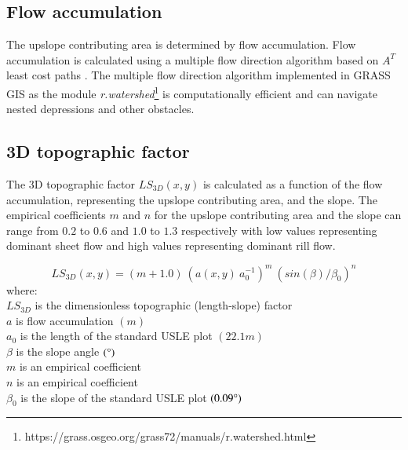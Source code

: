 \documentclass[final,3p,times,twocolumn]{elsarticle}
\begin{document}
\subsection{Flow accumulation}
The upslope contributing area is determined by flow accumulation. 
Flow accumulation is calculated using a multiple flow direction algorithm \cite{Metz2009} 
based on $A^{T}$ least cost paths \cite{Ehlschlaeger1989}. 
The multiple flow direction algorithm 
implemented in GRASS GIS as the module 
\textit{r.watershed}\footnote{https://grass.osgeo.org/grass72/manuals/r.watershed.html}
is computationally efficient and can
navigate nested depressions and other obstacles. 


\subsection{3D topographic factor}
The 3D topographic factor $LS_{3D}(x,y)$
is calculated as a function of 
the flow accumulation,
representing the upslope contributing area,
and the slope. 
%
The empirical coefficients $m$ and $n$
for the upslope contributing area 
and the slope
can range from $0.2$ to $0.6$
and $1.0$ to $1.3$ respectively
with low values representing dominant sheet flow
and high values representing dominant rill flow.


\begin{equation}
\label{eq:ls_factor}
{LS_{3D}(x,y) = (m+1.0) ~ (a(x,y) ~ a_0^{-1})^{m} ~ (sin(\beta) / \beta_0)^{n}}
\end{equation}
%
{\small
\noindent
where: \\
\noindent
\hspace*{0.5em} $LS_{3D}$ is the dimensionless topographic (length-slope) factor\\
\hspace*{0.5em} $a$ is flow accumulation $(m)$\\
\hspace*{0.5em} $a_0$ is the length of the standard USLE plot $(22.1 m)$\\
\hspace*{0.5em} $\beta$ is the slope angle $(\degree)$\\
\hspace*{0.5em} $m$ is an empirical coefficient\\
\hspace*{0.5em} $n$ is an empirical coefficient\\
\hspace*{0.5em} $\beta_0$ is the slope of the standard USLE plot $(0.09 \degree)$\\
}
\end{document}
